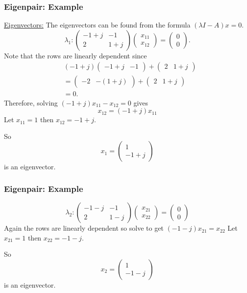\documentclass{beamer}
\begin{document}
\begin{frame}\frametitle{Eigenpair: Example}
	\par\underline{Eigenvectors:}
	The eigenvectors can be found from the formula
	\(
		(\lambda I-A)x = 0.
	\)
	\[ 
		\lambda_1: 
			\begin{pmatrix}
	    		-1+j & -1\\
	    		2 & 1+j
	  		\end{pmatrix}
			\begin{pmatrix}
	    		x_{11}\\x_{12}
	  		\end{pmatrix}
			=
			\begin{pmatrix}
	    		0\\0
	  		\end{pmatrix}.
	\]
	Note that the rows are linearly dependent since
	\begin{align*} 
		& (-1 + j) \begin{pmatrix}
	    			-1 + j & -1
	  			  \end{pmatrix} 
	  	+ \begin{pmatrix}
	    	2 & 1+j
	  	  \end{pmatrix} \\
	  	&= 
			\begin{pmatrix}
	    		-2 & -(1+j)
	  		\end{pmatrix}
	  		+	\begin{pmatrix}
	    			2 & 1 + j
	  			\end{pmatrix} \\
	  	&= 0.
	\end{align*}
	Therefore, solving $(-1 + j)x_{11} - x_{12} = 0$ gives
	\[ 
		x_{12} = (-1+j)x_{11} 
	\]
	Let $x_{11} = 1$ then $x_{12} = -1 + j$.
	
	So 
	\[
		x_1 
			= \begin{pmatrix}
	    		1\\-1+j
	  		   \end{pmatrix}
	\]
	is an eigenvector.
\end{frame}

\begin{frame}\frametitle{Eigenpair: Example}
	\[ 
		\lambda_2: 
			\begin{pmatrix}
	    		-1-j & -1\\
	    		2 & 1-j
	  		\end{pmatrix}
			\begin{pmatrix}
	    		x_{21}\\
	    		x_{22}
	  		\end{pmatrix}
			= 
			\begin{pmatrix}
	    		0\\0
	  		\end{pmatrix}
	  \]
	Again the rows are linearly dependent so solve to get
	\(
		(-1-j)x_{21} = x_{22}
	\)
	Let $x_{21} = 1$ then $x_{22} = -1 - j$.
	
	So 
	\[
		x_2 = \begin{pmatrix}
	    		1 \\ -1 -j
	  		  \end{pmatrix}
	\]
	is an eigenvector.
\end{frame}
\end{document}
